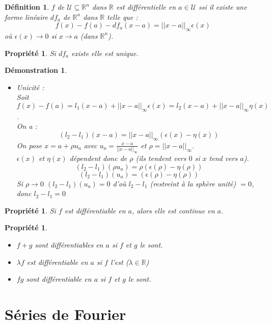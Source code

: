 \documentclass[a4paper, oneside]{report}
\theoremstyle{break}
\newtheorem{defi}[thm]{Définition}
\newtheorem{propr}[thm]{Propriété}
\newtheorem*{demo}{Démonstration}
\newcommand{\R}{\mathbb{R}}
\newcommand{\U}{\mathcal{U}}
\begin{document}
\begin{defi}
$f$ de $\U \subseteq \R^n$ dans $\R$ est différentielle en $a\in \U$ ssi il existe une forme linéaire $df_a$ de $\R^n$ dans $\R$ telle que :
$$f(x)-f(a)-df_a(x-a)=||x-a||_\infty \epsilon(x)$$
où $\epsilon(x)\rightarrow 0$ si $x\rightarrow a$ (dans $\R^n$).
\end{defi}

\begin{propr}
Si $df_a$ existe elle est unique.
\end{propr}

\begin{demo}
\begin{itemize}
\item Unicité :\\
Soit $f(x)-f(a)=l_1(x-a)+||x-a||_\infty \epsilon (x)=l_2(x-a)+||x-a||_\infty \eta (x)$.\\
On a :
$$(l_2-l_1)(x-a)=||x-a||_\infty (\epsilon(x)-\eta(x))$$
On pose $x=a+\rho u_a$ avec $u_a=\frac{x-a}{||x-a||_\infty}$ et $\rho=||x-a||_\infty$.\\
$\epsilon(x)$ et $\eta(x)$ dépendent donc de $\rho$ (ils tendent vers $0$ si $x$ tend vers $a$).
$$(l_2-l_1)(\rho u_a)=\rho (\epsilon(\rho)-\eta(\rho))$$
$$(l_2-l_1)(u_a)=(\epsilon(\rho)-\eta(\rho))$$
Si $\rho \rightarrow 0$ $(l_2-l_1)(u_a)=0$ d'où $l_2-l_1$ (restreint à la sphère unité) $=0$, donc $l_2-l_1=0$
\end{itemize}
\end{demo}

\begin{propr}
Si $f$ est différentiable en $a$, alors elle est continue en $a$.
\end{propr}

\begin{propr}
\begin{itemize}
\item $f+g$ sont différentiables en $a$ si $f$ et $g$ le sont.
\item $\lambda f$ est différentiable en $a$ si $f$ l'est ($\lambda \in \R$)
\item $fg$ sont différentiable en $a$ si $f$ et $g$ le sont.
\end{itemize}
\end{propr}

























\chapter{Séries de Fourier}
\end{document}
